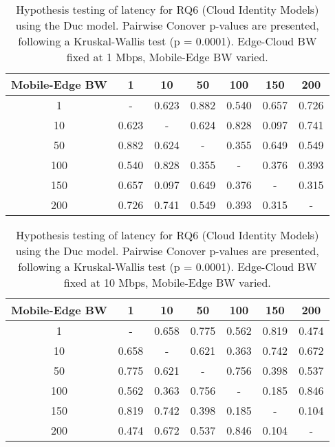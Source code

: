 \begin{table}[H]
\caption{Hypothesis testing of latency for RQ6 (Cloud Identity Models) using the Duc model. Pairwise Conover p-values are presented, following a Kruskal-Wallis test (p = 0.0001). Edge-Cloud BW fixed at 1 Mbps, Mobile-Edge BW varied.}
\centering
\begin{tabular}{c|cccccc}
Mobile-Edge BW & 1 & 10 & 50 & 100 & 150 & 200 \\
\hline
1 & - & 0.623 & 0.882 & 0.540 & 0.657 & 0.726 \\
10 & 0.623 & - & 0.624 & 0.828 & 0.097 & 0.741 \\
50 & 0.882 & 0.624 & - & 0.355 & 0.649 & 0.549 \\
100 & 0.540 & 0.828 & 0.355 & - & 0.376 & 0.393 \\
150 & 0.657 & 0.097 & 0.649 & 0.376 & - & 0.315 \\
200 & 0.726 & 0.741 & 0.549 & 0.393 & 0.315 & - \\
\end{tabular}
\end{table}

\begin{table}[H]
\caption{Hypothesis testing of latency for RQ6 (Cloud Identity Models) using the Duc model. Pairwise Conover p-values are presented, following a Kruskal-Wallis test (p = 0.0001). Edge-Cloud BW fixed at 10 Mbps, Mobile-Edge BW varied.}
\centering
\begin{tabular}{c|cccccc}
Mobile-Edge BW & 1 & 10 & 50 & 100 & 150 & 200 \\
\hline
1 & - & 0.658 & 0.775 & 0.562 & 0.819 & 0.474 \\
10 & 0.658 & - & 0.621 & 0.363 & 0.742 & 0.672 \\
50 & 0.775 & 0.621 & - & 0.756 & 0.398 & 0.537 \\
100 & 0.562 & 0.363 & 0.756 & - & 0.185 & 0.846 \\
150 & 0.819 & 0.742 & 0.398 & 0.185 & - & 0.104 \\
200 & 0.474 & 0.672 & 0.537 & 0.846 & 0.104 & - \\
\end{tabular}
\end{table}

